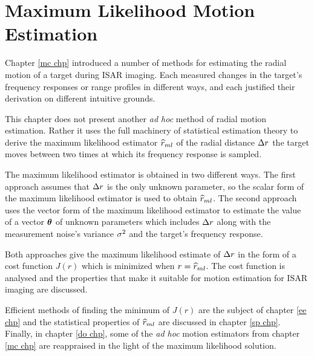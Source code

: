 %
%
%
%
%
%
%

\chapter{Maximum Likelihood Motion Estimation}
\label{ml chp}

\bigletter Chapter \ref{mc chp} introduced a number of methods for
estimating the radial motion of a target during ISAR imaging.  Each
measured changes in the target's frequency responses or range profiles in
different ways, and each justified their derivation on different intuitive
grounds.  

This chapter does not present another {\em ad hoc\/} method of radial
motion estimation.  Rather it uses the full machinery of statistical
estimation theory to derive the maximum likelihood estimator $\widehat{r}_{ml}$ of the
radial distance ${\Delta r}$ the target moves between two times at which its
frequency response is sampled.

The maximum likelihood estimator is obtained in two different ways.  The
first approach assumes that ${\Delta r}$ is the only unknown parameter, so the
scalar form of the maximum likelihood estimator is used to obtain $\widehat{r}_{ml}$. 
The second approach uses the vector form of the maximum likelihood
estimator to estimate the value of a vector $\bm{\theta}$ of unknown parameters
which includes ${\Delta r}$ along with the measurement noise's variance ${\sigma^2}$ and
the target's frequency response.  

Both approaches give the maximum likelihood estimate of ${\Delta r}$ in the form
of a cost function $J(r)$ which is minimized when $r=\widehat{r}_{ml}$.  The cost
function is analysed and the properties that make it suitable for motion
estimation for ISAR imaging are discussed.

Efficient methods of finding the minimum of $J(r)$ are the subject of
chapter \ref{ee chp} and the statistical properties of $\widehat{r}_{ml}$
are discussed in chapter \ref{sp chp}.  Finally, in chapter \ref{do chp}, 
some of the {\em ad hoc\/}
motion estimators from chapter \ref{mc chp} are reappraised in the light of
the maximum likelihood solution.

